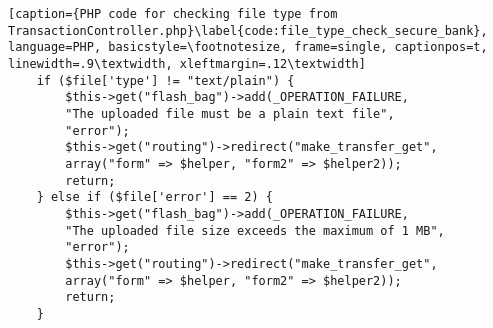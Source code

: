 \begin{lstlisting}[caption={PHP code for checking file type from TransactionController.php}\label{code:file_type_check_secure_bank}, language=PHP, basicstyle=\footnotesize, frame=single, captionpos=t, linewidth=.9\textwidth, xleftmargin=.12\textwidth]
    if ($file['type'] != "text/plain") {
        $this->get("flash_bag")->add(_OPERATION_FAILURE,
        "The uploaded file must be a plain text file",
        "error");
        $this->get("routing")->redirect("make_transfer_get",
        array("form" => $helper, "form2" => $helper2));
        return;
    } else if ($file['error'] == 2) {
        $this->get("flash_bag")->add(_OPERATION_FAILURE,
        "The uploaded file size exceeds the maximum of 1 MB",
        "error");
        $this->get("routing")->redirect("make_transfer_get",
        array("form" => $helper, "form2" => $helper2));
        return;
    }
\end{lstlisting}
\clearpage